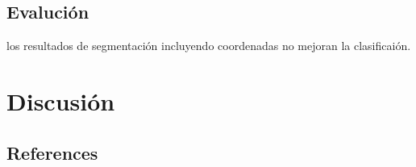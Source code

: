 \documentclass[10pt,twocolumn,letterpaper]{article}
\begin{document}
\subsection{Evalución}

los resultados de segmentación incluyendo coordenadas no mejoran la clasificaión.


\section{Discusión}

\subsection{References}
\end{document}
